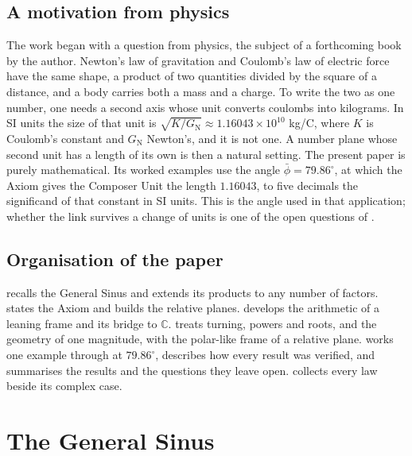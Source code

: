 \documentclass[11pt,a4paper]{amsart}
\theoremstyle{plain}
\theoremstyle{definition}
\theoremstyle{remark}
\newcommand{\pb}{\bar{\phi}}                     %
\newcommand{\C}{\mathbb{C}}
\begin{document}
\subsection{A motivation from physics}

The work began with a question from physics, the subject of a forthcoming book by the author. Newton's law of gravitation \citep{Newton1687} and Coulomb's law of electric force \citep{Coulomb1785} have the same shape, a product of two quantities divided by the square of a distance, and a body carries both a mass and a charge. To write the two as one number, one needs a second axis whose unit converts coulombs into kilograms. In SI units the size of that unit is $\sqrt{K/G_{\mathrm{N}}} \approx 1.16043 \times 10^{10}$ kg/C, where $K$ is Coulomb's constant and $G_{\mathrm{N}}$ Newton's, and it is not one. A number plane whose second unit has a length of its own is then a natural setting. The present paper is purely mathematical. Its worked examples use the angle $\pb = 79.86^\circ$, at which the Axiom gives the Composer Unit the length $1.16043$, to five decimals the significand of that constant in SI units. This is the angle used in that application; whether the link survives a change of units is one of the open questions of .

\subsection{Organisation of the paper}

 recalls the General Sinus and extends its products to any number of factors.  states the Axiom and builds the relative planes.  develops the arithmetic of a leaning frame and its bridge to $\C$.  treats turning, powers and roots, and  the geometry of one magnitude, with the polar-like frame of a relative plane.  works one example through at $79.86^\circ$,  describes how every result was verified, and  summarises the results and the questions they leave open.  collects every law beside its complex case.

\section{The General Sinus}\label{sec:gs}
\end{document}
